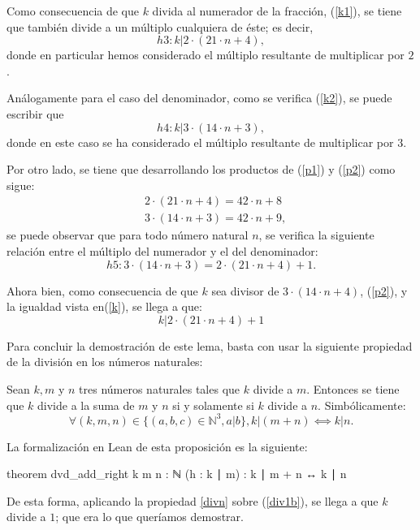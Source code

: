 \begin{demostracion}
  Como consecuencia de que \(k\) divida al numerador de la fracción,
  (\ref{k1}), se tiene que también divide a un múltiplo cualquiera de
  éste; es decir,
  \begin{equation}\label{p1}
    h3: k | 2⋅(21⋅n+4),
  \end{equation}
  donde en particular hemos considerado el múltiplo resultante de
  multiplicar por \(2\).

  Análogamente para el caso del denominador, como se verifica
  (\ref{k2}), se puede escribir que
  \begin{equation}\label{p2}
    h4: k | 3⋅(14⋅n+3),
  \end{equation}
  donde en este caso se ha considerado el múltiplo resultante de
  multiplicar por \(3\).

  Por otro lado, se tiene que desarrollando los productos de (\ref{p1}) y
  (\ref{p2}) como sigue:
  \begin{align}
    & 2⋅(21⋅n+4)=42⋅n+8    \\
    & 3·(14·n+3)=42·n+9,
  \end{align}
  se puede observar que para todo número natural \(n\), se verifica la
  siguiente relación entre el múltiplo del numerador y el del denominador:
  \begin{equation}\label{k}
    h5: 3⋅(14⋅n+3)=2⋅(21⋅n+4)+1.
  \end{equation}

  Ahora bien, como consecuencia de que \(k\) sea divisor de
  \(3⋅(14⋅n+4)\), (\ref{p2}), y la igualdad vista en(\ref{k}), se llega
  a que:
  \begin{equation}\label{div1b}
    k | 2⋅(21⋅n+4)+1
  \end{equation}

  Para concluir la demostración de este lema, basta con usar la siguiente
  propiedad de la división en los números naturales:

  \begin{proposicion}\label{divn}
    Sean \(k,m\) y \(n\) tres números naturales tales que \(k\) divide a
    \(m\). Entonces se tiene que \(k\) divide a la suma de \(m\) y \(n\)
    si y solamente si \(k\) divide a \(n\). Simbólicamente:
    \begin{equation}
      ∀(k,m,n) ∈ \{(a,b,c) ∈ ℕ^3 , a|b\}, k | (m+n) ⟺ k|n.
    \end{equation}
  \end{proposicion}

  La formalización en Lean de esta proposición es la siguiente:

  \begin{leancode}
    theorem dvd_add_right {k m n : ℕ} (h : k ∣ m) : k ∣ m + n ↔ k ∣ n
  \end{leancode}

  De esta forma, aplicando la propiedad \ref{divn} sobre (\ref{div1b}),
  se llega a que \(k\) divide a \(1\); que era lo que queríamos
  demostrar.
\end{demostracion}


